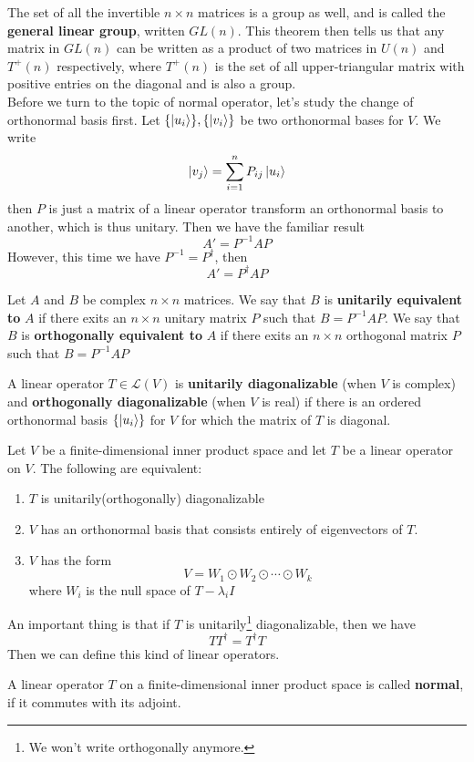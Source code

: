 \documentclass{article}
\begin{document}
The set of all the invertible $n\times n$ matrices is a group as well, and is called the \textbf{general linear group}, written $GL(n)$. This theorem then tells us that any matrix in $GL(n)$ can be written as a product of two matrices in $U(n)$ and $T^+(n)$ respectively, where $T^+(n)$ is the set of all upper-triangular matrix with positive entries on the diagonal and is also a group.\\
\indent Before we turn to the topic of normal operator, let's study the change of orthonormal basis first. Let $\{\ket{u_i}\},\{\ket{v_i}\}$ be two orthonormal bases for $V$. We write
\[\ket{v_j}=\sum_{i=1}^nP_{ij}\ket{u_i}\]
then $P$ is just a matrix of a linear operator transform an orthonormal basis to another, which is thus unitary. Then we have the familiar result
\[A'=P^{-1}AP\]
However, this time we have $P^{-1}=P^\dagger$, then
\[A'=P^\dagger AP\]
\begin{dde}
	Let $A$ and $B$ be complex $n\times n$ matrices. We say that $B$ is \textbf{unitarily equivalent to} $A$ if there exits an $n\times n$ unitary matrix $P$ such that $B=P^{-1}AP$. We say that $B$ is \textbf{orthogonally equivalent to} $A$ if there exits an $n\times n$ orthogonal matrix $P$ such that $B=P^{-1}AP$
\end{dde}
\begin{dde}
	A linear operator $T\in\mathcal{L}(V)$ is \textbf{unitarily diagonalizable} (when $V$ is complex) and \textbf{orthogonally diagonalizable} (when $V$ is real) if there is an ordered orthonormal basis $\{\ket{u_i}\}$ for $V$ for which the matrix of $T$ is diagonal.
\end{dde}
\begin{thm}
	Let $V$ be a finite-dimensional inner product space and let $T$ be a linear operator on $V$. The following are equivalent:
	\begin{enumerate}
		\item $T$ is unitarily(orthogonally) diagonalizable
		\item $V$ has an orthonormal basis that consists entirely of eigenvectors of $T$.
		\item $V$ has the form
		\[V=W_1\odot W_2\odot\cdots\odot W_k\]
		where $W_i$ is the null space of $T-\lambda_iI$
	\end{enumerate}
\end{thm}
An important thing is that if $T$ is unitarily\footnote{We won't write orthogonally anymore.} diagonalizable, then we have
\[TT^\dagger=T^\dagger T\]
Then we can define this kind of linear operators.
\begin{dde}
	A linear operator $T$ on a finite-dimensional inner product space is called \textbf{normal}, if it commutes with its adjoint.
\end{dde}
\end{document}
